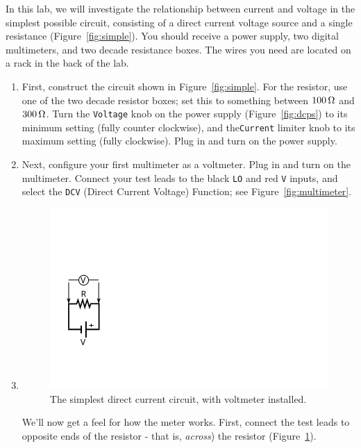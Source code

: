 \documentclass[12pt]{article}
\begin{document}
In this lab, we will investigate the relationship between current and
voltage in the simplest possible circuit, consisting of a direct
current voltage source and a single resistance
(Figure~\ref{fig:simple}).  You should receive a power supply, two
digital multimeters, and two decade resistance boxes.  The wires you
need are located on a rack in the back of the lab.
\begin{enumerate}
\item {} First, construct the circuit shown in Figure~\ref{fig:simple}.
  For the resistor, use one of the two decade resistor boxes; set this
  to something between $\unit[100]{\Omega}$ and $\unit[300]{\Omega}$.
  Turn the \texttt{Voltage} knob on the power supply
  (Figure~\ref{fig:dcps}) to its minimum setting (fully counter
  clockwise), and the\texttt{Current} limiter knob to its maximum
  setting (fully clockwise).  Plug in and turn on the power supply.
\item Next, configure your first multimeter as a voltmeter.  Plug in
  and turn on the multimeter.  Connect your test leads to the black
  \texttt{LO} and red \texttt{V} inputs, and select the \texttt{DCV}
  (Direct Current Voltage) Function; see Figure~\ref{fig:multimeter}.
\item 
  \begin{figure}
    \centering
    \includegraphics[width=\textwidth/5]{figures/simplest_with_voltmeter}
    \caption{The simplest direct current circuit, with voltmeter installed.}
    \label{fig:simplest_with_voltmeter}
  \end{figure}
  We'll now get a feel for how the meter works.  First, connect the
  test leads to opposite ends of the resistor - that is,
  \textit{across}) the resistor
  (Figure~\ref{fig:simplest_with_voltmeter}).
  

\end{enumerate}
\end{document}
